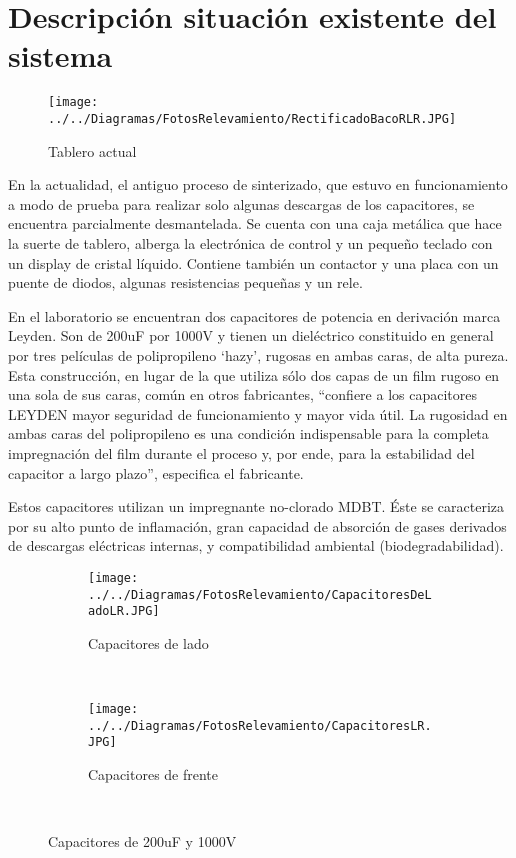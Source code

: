 \documentclass[12pt]{article}
\begin{document}
  \newpage

  \section{Descripción situación existente del sistema}

  \begin{wrapfigure}{r}{0.50\textwidth}
      \vspace{-20pt}    
      \begin{center}
      \texttt{[image: ../../Diagramas/FotosRelevamiento/RectificadoBacoRLR.JPG]}
     \end{center}
    \caption{Tablero actual}
  \end{wrapfigure}
  
  En la actualidad, el antiguo proceso de sinterizado, que estuvo en funcionamiento a modo de prueba para realizar solo algunas 
  descargas de los capacitores, se encuentra parcialmente desmantelada. 
  Se cuenta con una caja metálica que hace la suerte de tablero, alberga la electrónica de control y un pequeño teclado con un
  display de cristal líquido. Contiene también un contactor y una placa con un puente de diodos, algunas resistencias pequeñas y un rele.

En el laboratorio se encuentran dos capacitores de potencia en derivación marca Leyden. Son de 200uF por 1000V y tienen un dieléctrico constituido en general por tres películas de polipropileno ‘hazy’, 
rugosas en ambas caras, de alta pureza. Esta construcción, en lugar de la que utiliza sólo dos capas de un film rugoso en una sola de sus caras, común en otros fabricantes, ``confiere a los capacitores
LEYDEN mayor seguridad de funcionamiento y mayor vida útil. La rugosidad en ambas caras del polipropileno es una condición indispensable para la completa impregnación
del film durante el proceso y, por ende, para la estabilidad del capacitor a largo plazo'', especifica el fabricante. \newline

Estos capacitores utilizan un impregnante no-clorado MDBT. Éste se caracteriza por su alto punto de inflamación, gran capacidad de absorción de gases derivados de descargas eléctricas internas,
 y compatibilidad ambiental (biodegradabilidad).

  \begin{figure}[h!]

    \begin{subfigure}[b]{0.5\textwidth}
      \centering
      \texttt{[image: ../../Diagramas/FotosRelevamiento/CapacitoresDeLadoLR.JPG]}
      \caption{Capacitores de lado}
    \end{subfigure}
    ~
    \begin{subfigure}[b]{0.5\textwidth}
      \centering
      \texttt{[image: ../../Diagramas/FotosRelevamiento/CapacitoresLR.JPG]}
      \caption{Capacitores de frente}
     \end{subfigure}
    ~
    \caption{Capacitores de 200uF y 1000V}

  \end{figure}
\end{document}
